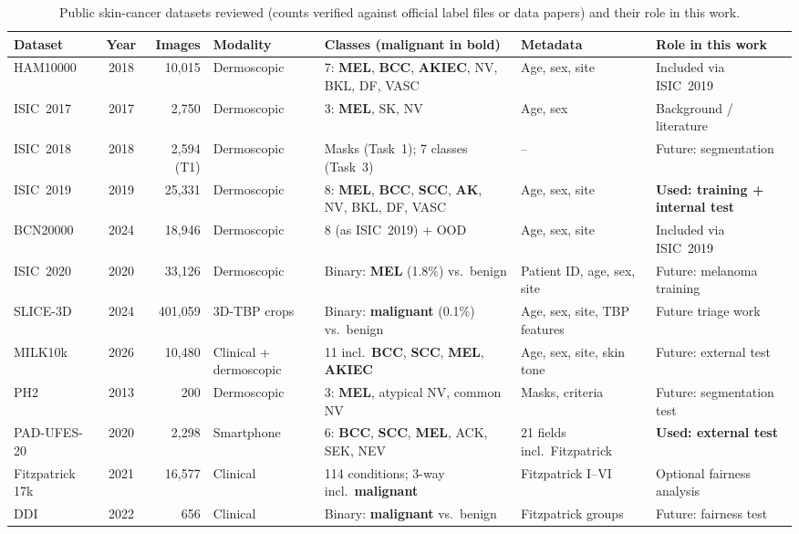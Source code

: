 \begin{table}[t]
\centering
\caption{Public skin-cancer datasets reviewed (counts verified against official label files or data papers) and their role in this work.}
\label{tab:data}
\renewcommand{\arraystretch}{1.15}
\scriptsize
\begin{tabularx}{\textwidth}{@{}l c r l L{4.2cm} l Y@{}}
\toprule
\textbf{Dataset} & \textbf{Year} & \textbf{Images} & \textbf{Modality} & \textbf{Classes (malignant in bold)} & \textbf{Metadata} & \textbf{Role in this work} \\
\midrule
HAM10000~\cite{tschandl2018ham10000} & 2018 & 10{,}015 & Dermoscopic & 7: \textbf{MEL}, \textbf{BCC}, \textbf{AKIEC}, NV, BKL, DF, VASC & Age, sex, site & Included via ISIC~2019 \\
ISIC~2017~\cite{codella2018isic2017} & 2017 & 2{,}750 & Dermoscopic & 3: \textbf{MEL}, SK, NV & Age, sex & Background / literature \\
ISIC~2018~\cite{codella2019isic2018} & 2018 & 2{,}594 (T1) & Dermoscopic & Masks (Task~1); 7 classes (Task~3) & -- & Future: segmentation \\
ISIC~2019~\cite{gessert2020} & 2019 & 25{,}331 & Dermoscopic & 8: \textbf{MEL}, \textbf{BCC}, \textbf{SCC}, \textbf{AK}, NV, BKL, DF, VASC & Age, sex, site & \textbf{Used: training + internal test} \\
BCN20000~\cite{hernandez2024bcn20000} & 2024 & 18{,}946 & Dermoscopic & 8 (as ISIC~2019) + OOD & Age, sex, site & Included via ISIC~2019 \\
ISIC~2020~\cite{rotemberg2021isic2020} & 2020 & 33{,}126 & Dermoscopic & Binary: \textbf{MEL} (1.8\%) vs.\ benign & Patient ID, age, sex, site & Future: melanoma training \\
SLICE-3D~\cite{kurtansky2024slice3d} & 2024 & 401{,}059 & 3D-TBP crops & Binary: \textbf{malignant} (0.1\%) vs.\ benign & Age, sex, site, TBP features & Future triage work \\
MILK10k~\cite{tschandl2026milk10k} & 2026 & 10{,}480 & Clinical + dermoscopic & 11 incl.\ \textbf{BCC}, \textbf{SCC}, \textbf{MEL}, \textbf{AKIEC} & Age, sex, site, skin tone & Future: external test \\
PH2~\cite{mendonca2013ph2} & 2013 & 200 & Dermoscopic & 3: \textbf{MEL}, atypical NV, common NV & Masks, criteria & Future: segmentation test \\
PAD-UFES-20~\cite{pacheco2020padufes20} & 2020 & 2{,}298 & Smartphone & 6: \textbf{BCC}, \textbf{SCC}, \textbf{MEL}, ACK, SEK, NEV & 21 fields incl.\ Fitzpatrick & \textbf{Used: external test} \\
Fitzpatrick 17k~\cite{groh2021fitzpatrick17k} & 2021 & 16{,}577 & Clinical & 114 conditions; 3-way incl.\ \textbf{malignant} & Fitzpatrick I--VI & Optional fairness analysis \\
DDI~\cite{daneshjou2022ddi} & 2022 & 656 & Clinical & Binary: \textbf{malignant} vs.\ benign & Fitzpatrick groups & Future: fairness test \\
\bottomrule
\end{tabularx}
\end{table}

